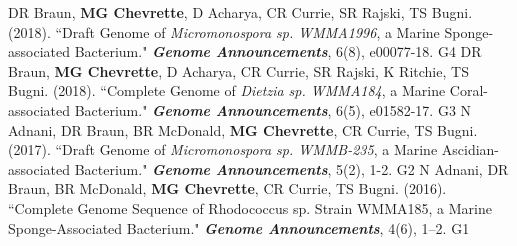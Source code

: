 \begin{cvpubs}
  \cvpub
    {DR Braun, \textbf{MG Chevrette}, D Acharya, CR Currie, SR Rajski, TS Bugni. (2018). ``Draft Genome of \textit{Micromonospora sp. WMMA1996}, a Marine Sponge-associated Bacterium." \textit{\textbf{Genome Announcements}}, 6(8), e00077-18. \textbf{\textit{}} }  %
    {G4} %
  \cvpub
    {DR Braun, \textbf{MG Chevrette}, D Acharya, CR Currie, SR Rajski, K Ritchie, TS Bugni. (2018). ``Complete Genome of \textit{Dietzia sp. WMMA184}, a Marine Coral-associated Bacterium." \textit{\textbf{Genome Announcements}}, 6(5), e01582-17. \textbf{\textit{}} } %
    {G3} %
  \cvpub
    {N Adnani, DR Braun, BR McDonald, \textbf{MG Chevrette}, CR Currie, TS Bugni. (2017). ``Draft Genome of \textit{Micromonospora sp. WMMB-235}, a Marine Ascidian-associated Bacterium." \textit{\textbf{Genome Announcements}}, 5(2), 1-2. \textbf{\textit{}} } %
    {G2} %
  \cvpub
  {N Adnani, DR Braun, BR McDonald, \textbf{MG Chevrette}, CR Currie, TS Bugni. (2016). ``Complete Genome Sequence of Rhodococcus sp. Strain WMMA185, a Marine Sponge-Associated Bacterium." \textit{\textbf{Genome Announcements}}, 4(6), 1–2. \textbf{\textit{}}} %
    {G1} %
\end{cvpubs}


